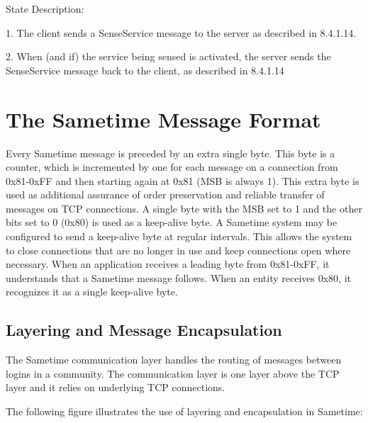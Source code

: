 \documentclass[titlepage,oneside]{book}
\begin{document}
\par{} State Description:

\par{} 1. The client sends a SenseService message to the server as
described in 8.4.1.14.

\par{} 2. When (and if) the service being sensed is activated, the
server sends the SenseService message back to the client, as described
in 8.4.1.14

\chapter{The Sametime Message Format}

\par{} Every Sametime message is preceded by an extra single
byte. This byte is a counter, which is incremented by one for each
message on a connection from 0x81-0xFF and then starting again at 0x81
(MSB is always 1). This extra byte is used as additional assurance of
order preservation and reliable transfer of messages on TCP
connections. A single byte with the MSB set to 1 and the other bits
set to 0 (0x80) is used as a keep-alive byte. A Sametime system may be
configured to send a keep-alive byte at regular intervals. This allows
the system to close connections that are no longer in use and keep
connections open where necessary. When an application receives a
leading byte from 0x81-0xFF, it understands that a Sametime message
follows. When an entity receives 0x80, it recognizes it as a single
keep-alive byte.

\section{Layering and Message Encapsulation}

\par{} The Sametime communication layer handles the routing of
messages between logins in a community. The communication layer is one
layer above the TCP layer and it relies on underlying TCP connections.

\par{} The following figure illustrates the use of layering and
encapsulation in Sametime:
\end{document}
